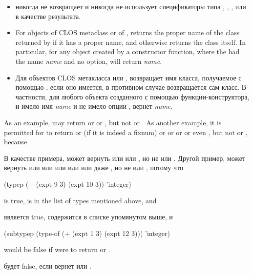 \begin{defun}[Function]
\begin{new}
\begin{itemize}
\item
{} никогда не возвращает  и никогда не использует
спецификаторы типа , , ,  или  в
качестве результата.

\item
For objects of CLOS metaclass  or of ,
 returns the proper name of the class returned by 
if it has a proper name, and otherwise returns the class itself.
In particular,
for any object created by a  constructor function,
where the  had the name \textit{name} and no  option,
 will return \textit{name}.

\item
Для объектов CLOS метакласса  или ,
 возвращает имя класса, получаемое с помощью , если оно
имеется, в противном случае возвращается сам класс.
В частности, для любого объекта созданного с помощью 
функции-конструктора, и  имело имя \textit{name} и не имело опции
,  вернет \textit{name}.

\end{itemize}

As an example, 
may return  or  or ,
but not  or .
As another example, it is permitted for
 to return
 or  (if it is indeed a fixnum) or
 or  or 
or even , but not  or , because

В качестве примера,  может вернуть
 или  или , но не
 или .
Другой пример,  может вернуть  или 
или  или  или  или даже , но не  или , потому что
\begin{lisp}
(typep (+ (expt 9 3) (expt 10 3)) 'integer)
\end{lisp}
is true,  is in the list of types mentioned above, and

является true,  содержится в списке упомянутом выше, и 
\begin{lisp}
(subtypep (type-of (+ (expt 1 3) (expt 12 3))) 'integer)
\end{lisp}
would be false if  were to return  or .

будет false, если  вернет  или .
\end{new}
\end{defun}


